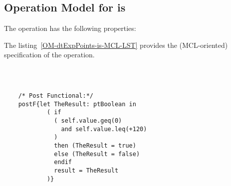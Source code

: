 \subsection{Operation Model for is}

\label{OM-is}


The  operation has the following properties:

	\begin{operationmodel}



		


	\end{operationmodel}



	\vspace{1cm}
	The listing~\ref{OM-dtExpPoints-is-MCL-LST} provides the \msrmessir (MCL-oriented) specification of the operation.
	
	\scriptsize
	\vspace{0.5cm}
	\begin{lstlisting}[style=MessirStyle,firstnumber=auto,captionpos=b,caption={\msrmessir (MCL-oriented) specification of the operation \emph{is}.},label=OM-dtExpPoints-is-MCL-LST]

	
	
	/* Post Functional:*/ 
	postF{let TheResult: ptBoolean in
	        ( if
	          ( self.value.geq(0)
	            and self.value.leq(+120)
	          )
	          then (TheResult = true)
	          else (TheResult = false)
	          endif
	          result = TheResult
	        )}
	
	
	\end{lstlisting}
	\normalsize 
	
	
	
	





